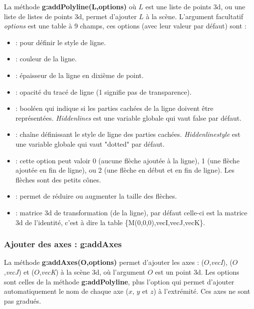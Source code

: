 \documentclass[%
10pt,%
a4paper,%
french,%
]%
{article}%
\begin{document}
La méthode \textbf{g:addPolyline(L,options)} où $L$ est une liste de points 3d, ou une liste de listes de points 3d, permet d'ajouter $L$ à la scène. L'argument facultatif \emph{options} est une table à 9 champs, ces options (avec leur valeur par défaut) sont :
    \begin{itemize}
        \item {} : pour définir le style de ligne.
        \item {} : couleur de la ligne.
        \item {} : épaisseur de la ligne en dixième de point.
        \item {} : opacité du tracé de ligne (1 signifie pas de transparence).
        \item {} : booléen qui indique si les parties cachées de la ligne doivent être représentées. \emph{Hiddenlines} est une variable globale qui vaut false par défaut.
        \item {} : chaîne définissant le style de ligne des parties cachées. \emph{Hiddenlinestyle} est une variable globale qui vaut "dotted" par défaut.
        \item {} : cette option peut valoir 0 (aucune flèche ajoutée à la ligne), 1 (une flèche ajoutée en fin de ligne), ou 2 (une flèche en début et en fin de ligne). Les flèches sont des petits cônes.
        \item {} : permet de réduire ou augmenter la taille des flèches.
        \item {} : matrice 3d de transformation (de la ligne), par défaut celle-ci est la matrice 3d de l'identité, c'est à dire la table \{M(0,0,0),vecI,vecJ,vecK\}.
    \end{itemize}
    
\subsubsection{Ajouter des axes : g:addAxes}

La méthode \textbf{g:addAxes(O,options)} permet d'ajouter les axes : ($O$,\emph{vecI}), ($O$,\emph{vecJ}) et ($O$,\emph{vecK}) à la scène 3d, où l'argument $O$ est un point 3d. Les options sont celles de la méthode \textbf{g:addPolyline}, plus l'option  qui permet d'ajouter automatiquement le nom de chaque axe ($x$, $y$ et $z$) à l'extrémité. Ces axes ne sont pas gradués.
    
\end{document}

